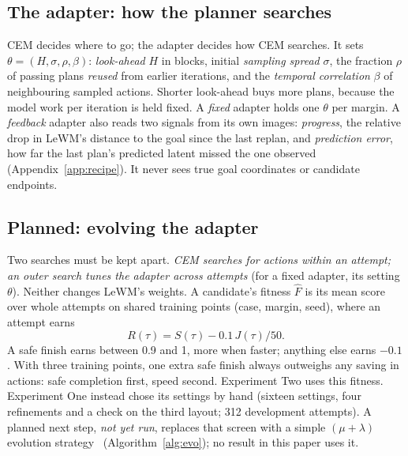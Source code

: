 \documentclass[sigconf,nonacm]{acmart}
\begin{document}
\subsection{The adapter: how the planner searches}\label{sec:adapter}
CEM decides where to go; the adapter decides how CEM searches. It sets
$\theta=(H,\sigma,\rho,\beta)$: \emph{look-ahead} $H$ in blocks, initial
\emph{sampling spread} $\sigma$, the fraction $\rho$ of passing plans
\emph{reused} from earlier iterations, and the \emph{temporal correlation}
$\beta$ of neighbouring sampled actions. Shorter look-ahead buys more plans,
because the model work per iteration is held fixed. A \emph{fixed} adapter
holds one $\theta$ per margin. A \emph{feedback} adapter also reads two
signals from its own images: \emph{progress}, the relative drop in LeWM's
distance to the goal since the last replan, and \emph{prediction error}, how
far the last plan's predicted latent missed the one observed
(Appendix~\ref{app:recipe}). It never sees true goal coordinates or
candidate endpoints.

\subsection{Planned: evolving the adapter}\label{sec:outer}
Two searches must be kept apart. \emph{CEM searches for actions within an
attempt; an outer search tunes the adapter across attempts} (for a fixed
adapter, its setting $\theta$). Neither changes LeWM's weights. A candidate's
fitness $\hat F$ is its mean score over whole attempts on shared training
points (case, margin, seed), where an attempt earns
\begin{equation}\label{eq:reward}
R(\tau)=S(\tau)-0.1\,J(\tau)/50.
\end{equation}
A safe finish earns between 0.9 and 1, more when faster; anything else
earns $-0.1$. With three training points, one extra safe finish always
outweighs any saving in actions: safe completion first, speed second.
Experiment Two uses this fitness. Experiment One instead chose its settings
by hand (sixteen settings, four refinements and a check on the third
layout; 312 development attempts). A planned next step, \emph{not yet run},
replaces that screen with a simple $(\mu+\lambda)$ evolution
strategy~\cite{beyer2002es} (Algorithm~\ref{alg:evo}); no result in this
paper uses it.
\end{document}
